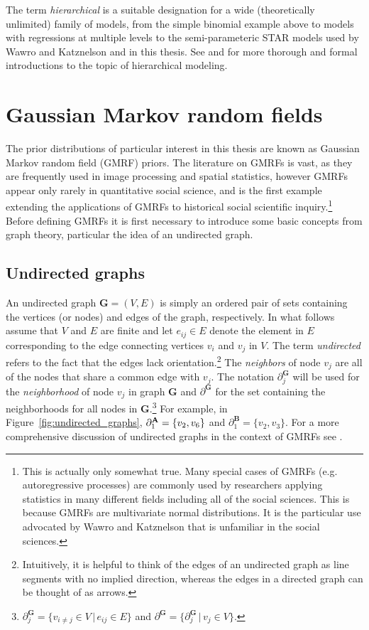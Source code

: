 The term {\it hierarchical} is a suitable designation for a wide (theoretically unlimited) family of 
models, from the simple binomial example above to models with regressions at multiple levels 
to the semi-parameteric STAR models used by Wawro and Katznelson and in this thesis. See  and  for more thorough and 
formal introductions to the topic of hierarchical modeling.  




\section{Gaussian Markov random fields}
\label{gmrf}

The prior distributions of particular interest in this thesis are known as Gaussian Markov random 
field (GMRF) priors. The literature on GMRFs is vast, as they are frequently used in image processing 
and spatial statistics, however GMRFs appear only rarely in quantitative social science, and  is the first example extending the applications of GMRFs to historical 
social scientific inquiry.\footnote{This is actually only somewhat true. Many special cases of GMRFs  
(e.g. autoregressive processes) are commonly used by researchers applying statistics in many different 
fields including all of the social sciences. This is because GMRFs are  multivariate normal distributions. 
It is the particular use advocated by Wawro and Katznelson that is unfamiliar in the social sciences.} 
Before defining GMRFs it is first necessary to introduce some basic concepts from graph theory, 
particular the idea of an undirected graph. 

\subsection{Undirected graphs}
\label{undirected_graphs}

An undirected graph $\mathbf{G} = (V,E)$ is simply an ordered pair of sets containing the 
vertices (or nodes) and edges of the graph, respectively. In what follows assume that $V$ 
and $E$ are finite and let $e_{ij} \in E$ denote the element in $E$ corresponding to the 
edge connecting vertices $v_i$ and $v_j$ in $V$. The term {\it undirected} refers to the fact 
that the edges lack orientation.\footnote{Intuitively, it is helpful to think of the edges of an 
undirected graph as line segments with no implied direction, whereas the edges in a directed 
graph can be thought of as arrows.} The {\it neighbors} of node $v_j$ are all of the nodes that 
share a common edge with $v_j$. The notation $\partial^{\mathbf{G}}_j$ will be used for the 
{\it neighborhood} of node $v_j$ in graph  $\mathbf{G}$ and $\partial^\mathbf{G}$ for the set 
containing the neighborhoods for all nodes in $\mathbf{G}$.\footnote{$ \partial^\mathbf{G}_j = 
\{v_{i \neq j} \in V \,\vert\, e_{ij} \in E\}$ and $\partial^\mathbf{G} = \{\partial^\mathbf{G}_j \,
\vert\, v_j \in V\}$.} For example, in Figure~\ref{fig:undirected_graphs}, 
$\partial^{\mathbf{A}}_1 = \{v_2, v_6\}$ and $\partial^{\mathbf{B}}_1 = \{v_2, v_3\}$.  For a more 
comprehensive discussion of undirected graphs in the context of GMRFs see . 

